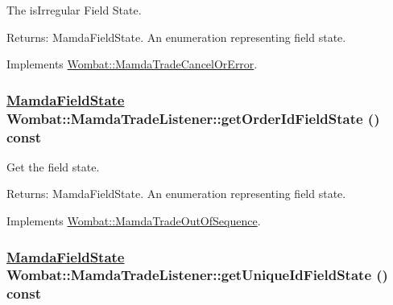 The is\-Irregular Field State. 

\begin{Desc}
\item[Returns:]Mamda\-Field\-State. An enumeration representing field state. \end{Desc}


Implements \hyperlink{classWombat_1_1MamdaTradeCancelOrError_f44398c02c719db7a0f706a177590297}{Wombat::Mamda\-Trade\-Cancel\-Or\-Error}.\hypertarget{classWombat_1_1MamdaTradeListener_f0f77145439c12c8bae3640307b50401}{
\subsubsection[getOrderIdFieldState]{\setlength{\rightskip}{0pt plus 5cm}\hyperlink{namespaceWombat_93aac974f2ab713554fd12a1fa3b7d2a}{Mamda\-Field\-State} Wombat::Mamda\-Trade\-Listener::get\-Order\-Id\-Field\-State () const}}
\label{classWombat_1_1MamdaTradeListener_f0f77145439c12c8bae3640307b50401}


Get the field state. 

\begin{Desc}
\item[Returns:]Mamda\-Field\-State. An enumeration representing field state. \end{Desc}


Implements \hyperlink{classWombat_1_1MamdaTradeOutOfSequence_76c6f61e99d00abf4d51b943606b2517}{Wombat::Mamda\-Trade\-Out\-Of\-Sequence}.\hypertarget{classWombat_1_1MamdaTradeListener_b0093f9dcf1bb03c17beb2915518a179}{
\subsubsection[getUniqueIdFieldState]{\setlength{\rightskip}{0pt plus 5cm}\hyperlink{namespaceWombat_93aac974f2ab713554fd12a1fa3b7d2a}{Mamda\-Field\-State} Wombat::Mamda\-Trade\-Listener::get\-Unique\-Id\-Field\-State () const}}
\label{classWombat_1_1MamdaTradeListener_b0093f9dcf1bb03c17beb2915518a179}


